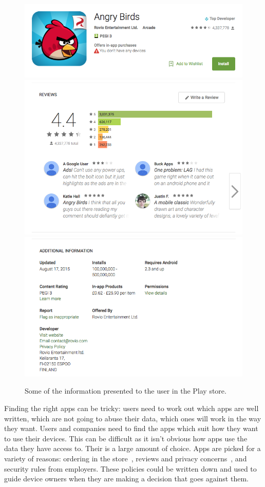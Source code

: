 \documentclass[a4paper]{scrartcl}
\begin{document}
\begin{figure}\centering
  \includegraphics[width=0.8\linewidth]{images/angrybirds.png}
  \includegraphics[width=0.8\linewidth]{images/reviews.png}
  \includegraphics[width=0.8\linewidth]{images/additionalinfo.png}
  \caption{Some of the information presented to the user in the Play store.}
  \label{fig:storeinfo}
\end{figure}

Finding the right apps can be tricky:
  users need to work out which apps are well written, which are not going to abuse their data, which ones will work in the way they want.
Users and companies need to find the apps which suit how they want to use their devices.
This can be difficult as it isn't obvious how apps use the data they have access to.
Their is a large amount of choice.
Apps are picked for a variety of reasons:
  ordering in the store~\citep{Prata:2012in},
  reviews and privacy concerns~\citep{Kelley:2013kc},
  and security rules from employers.
These policies could be written down and used to guide device owners when they are making a decision that goes against them.
\end{document}
